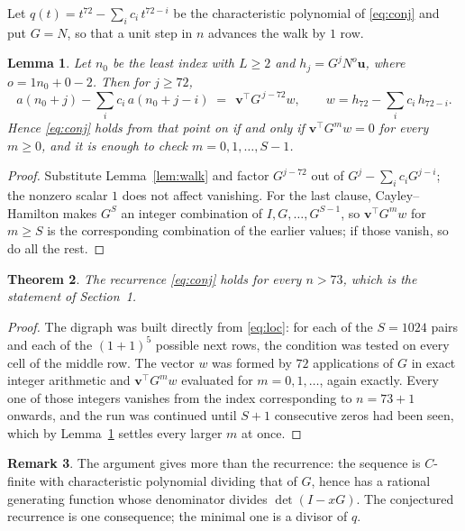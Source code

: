 \documentclass[11pt,a4paper]{article}
\theoremstyle{plain}
\newtheorem{theorem}{Theorem}
\newtheorem{lemma}[theorem]{Lemma}
\theoremstyle{definition}
\newtheorem{remark}[theorem]{Remark}
\begin{document}
Let $q(t)=t^{72}-\sum_i c_i\,t^{72-i}$ be the characteristic polynomial of
\eqref{eq:conj} and put $G=N$, so that a unit step in $n$ advances the walk by
$1$ row.

\begin{lemma}\label{lem:crit}
Let $n_0$ be the least index with $L\ge2$ and $h_j=G^{j}N^{o}\mathbf{u}$, where
$o=1n_0+0-2$. Then for $j\ge72$,
\[
a(n_0+j)-\sum_i c_i\,a(n_0+j-i)\;=\;\,\mathbf{v}^{\!\top}G^{\,j-72}w,
\qquad w=h_{72}-\sum_i c_i\,h_{72-i} .
\]
Hence \eqref{eq:conj} holds from that point on if and only if
$\mathbf{v}^{\!\top}G^{m}w=0$ for every $m\ge0$, and it is enough to check
$m=0,1,\dots,S-1$.
\end{lemma}

\begin{proof}
Substitute Lemma~\ref{lem:walk} and factor $G^{j-72}$ out of
$G^{j}-\sum_ic_iG^{j-i}$; the nonzero scalar $1$ does not affect
vanishing. For the last clause, Cayley--Hamilton makes $G^{S}$ an integer combination of
$I,G,\dots,G^{S-1}$, so $\mathbf{v}^{\!\top}G^{m}w$ for $m\ge S$ is the corresponding
combination of the earlier values; if those vanish, so do all the rest.
\end{proof}

\begin{theorem}
The recurrence \eqref{eq:conj} holds for every $n>73$, which is the statement of
Section~1.
\end{theorem}

\begin{proof}
The digraph was built directly from \eqref{eq:loc}: for each of the $S=1024$ pairs and each
of the $(1+1)^{5}$ possible next rows, the condition was tested on every cell of
the middle row. The vector $w$ was formed by $72$ applications of $G$ in exact integer
arithmetic and $\mathbf{v}^{\!\top}G^{m}w$ evaluated for $m=0,1,\dots$, again exactly.
Every one of those integers vanishes from the index corresponding to $n=73+1$ onwards,
and the run was continued until $S+1$ consecutive zeros had been seen, which by
Lemma~\ref{lem:crit} settles every larger $m$ at once.
\end{proof}

\begin{remark}
The argument gives more than the recurrence: the sequence is $C$-finite with characteristic
polynomial dividing that of $G$, hence has a rational generating function whose denominator
divides $\det(I-xG)$. The conjectured recurrence is one consequence; the minimal one is a
divisor of $q$.
\end{remark}
\end{document}
